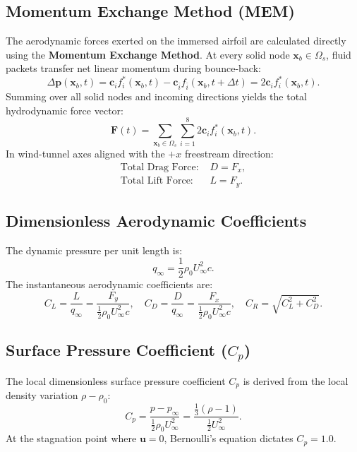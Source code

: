 \documentclass[11pt,a4paper]{article}
\begin{document}
\subsection{Momentum Exchange Method (MEM)}
The aerodynamic forces exerted on the immersed airfoil are calculated directly using the \textbf{Momentum Exchange Method}. At every solid node $\mathbf{x}_b \in \Omega_s$, fluid packets transfer net linear momentum during bounce-back:
\begin{equation}
\Delta \mathbf{p}(\mathbf{x}_b, t) = \mathbf{c}_i f_i^*(\mathbf{x}_b, t) - \mathbf{c}_{\bar{i}} f_{\bar{i}}(\mathbf{x}_b, t+\Delta t) = 2 \mathbf{c}_i f_i^*(\mathbf{x}_b, t).
\end{equation}
Summing over all solid nodes and incoming directions yields the total hydrodynamic force vector:
\begin{equation}
\mathbf{F}(t) = \sum_{\mathbf{x}_b \in \Omega_s} \sum_{i=1}^8 2 \mathbf{c}_i f_i^*(\mathbf{x}_b, t).
\end{equation}
In wind-tunnel axes aligned with the $+x$ freestream direction:
\begin{align}
\text{Total Drag Force: } & D = F_x, \\
\text{Total Lift Force: } & L = F_y.
\end{align}

\subsection{Dimensionless Aerodynamic Coefficients}
The dynamic pressure per unit length is:
\begin{equation}
q_\infty = \frac{1}{2} \rho_0 U_\infty^2 c.
\end{equation}
The instantaneous aerodynamic coefficients are:
\begin{equation}
C_L = \frac{L}{q_\infty} = \frac{F_y}{\frac{1}{2} \rho_0 U_\infty^2 c}, \quad
C_D = \frac{D}{q_\infty} = \frac{F_x}{\frac{1}{2} \rho_0 U_\infty^2 c}, \quad
C_R = \sqrt{C_L^2 + C_D^2}.
\end{equation}

\subsection{Surface Pressure Coefficient ($C_p$)}
The local dimensionless surface pressure coefficient $C_p$ is derived from the local density variation $\rho - \rho_0$:
\begin{equation}
C_p = \frac{p - p_\infty}{\frac{1}{2} \rho_0 U_\infty^2} = \frac{\frac{1}{3}(\rho - 1)}{\frac{1}{2} U_\infty^2}.
\end{equation}
At the stagnation point where $\mathbf{u} = 0$, Bernoulli's equation dictates $C_p = 1.0$.
\end{document}
